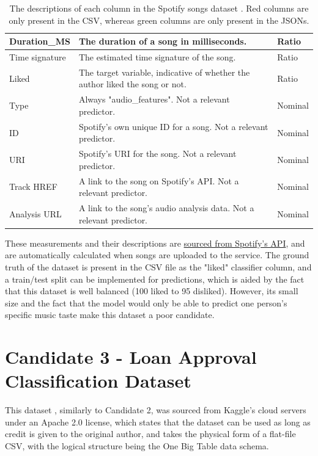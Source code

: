 \documentclass[12pt]{report}
\begin{document}
\begin{table}[H]
\begin{tabular}{ |p{}| p{}| p{}|}
            \hline
            Duration\_MS & The duration of a song in milliseconds.
            & Ratio\\
            \hline
            Time signature & The estimated time signature of the song.
            & Ratio\\
            \hline
            \cellcolor{red!15}Liked & The target variable, indicative of whether the author liked the song or not.
            & Ratio\\
            \hline
            \cellcolor{green!15}Type & Always "audio\_features". Not a relevant predictor.
            & Nominal\\
            \hline
            \cellcolor{green!15}ID & Spotify's own unique ID for a song. Not a relevant predictor.
            & Nominal\\
            \hline
            \cellcolor{green!15}URI & Spotify's URI for the song. Not a relevant predictor.
            & Nominal\\
            \hline
            \cellcolor{green!15}Track HREF & A link to the song on Spotify's API. Not a relevant predictor.
            & Nominal\\  
            \hline
            \cellcolor{green!15}Analysis URL & A link to the song's audio analysis data. Not a relevant predictor. 
            & Nominal\\
            \hline
    \end{tabular}
    \caption{The descriptions of each column in the Spotify songs dataset \autocite{spotify_web_nodate}. Red columns are only present in the CSV, whereas green columns are only present in the JSONs.}\label{tab:Spotify-Types}
\end{table}

These measurements and their descriptions are \href{https://developer.spotify.com/documentation/web-api/reference/get-audio-features}{sourced from Spotify's API},
and are automatically calculated when songs are uploaded to the service. The ground truth of the dataset is present in the CSV file as the "liked" classifier 
column, and a train/test split can be implemented for predictions, which is aided by the fact that this dataset is well balanced (100 liked to 95 disliked).
However, its small size and the fact that the model would only be able to predict one person's specific music taste make 
this dataset a poor candidate.


\section{Candidate 3 - Loan Approval Classification Dataset}\label{sec:Dataset}
This dataset \autocite{lo_loan_nodate}, similarly to Candidate 2, was sourced from Kaggle's cloud servers under 
an Apache 2.0 license, which states that the dataset can be used as long as credit is given to the original author,
and takes the physical form of a flat-file CSV, with the logical structure being the One Big Table data schema. 
\end{document}
